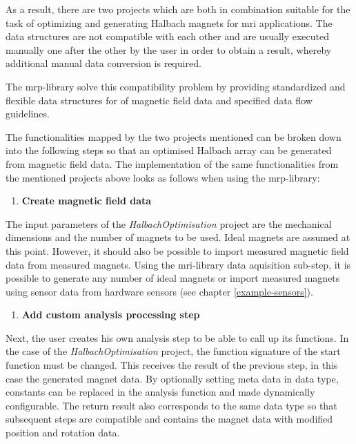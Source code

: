 As a result, there are two projects which are both in combination
suitable for the task of optimizing and generating Halbach magnets for
\gls{mri} applications. The data structures are not compatible with each
other and are usually executed manually one after the other by the user
in order to obtain a result, whereby additional manual data conversion
is required.

The \gls{mrp}-library solve this compatibility problem by providing
standardized and flexible data structures for of magnetic field data and
specified data flow guidelines.

The functionalities mapped by the two projects mentioned can be broken
down into the following steps so that an optimised Halbach array can be
generated from magnetic field data. The implementation of the same
functionalities from the mentioned projects above looks as follows when
using the \gls{mrp}-library:

\begin{enumerate}
\def\labelenumi{\arabic{enumi}.}
\tightlist
\item
  \textbf{Create magnetic field data}
\end{enumerate}

The input parameters of the \emph{HalbachOptimisation} 
project are the mechanical dimensions and the number of magnets to be
used. Ideal magnets are assumed at this point. However, it should also
be possible to import measured magnetic field data from measured
magnets. Using the \gls{mri}-library data aquisition sub-step, it is
possible to generate any number of ideal magnets or import measured
magnets using sensor data from hardware sensors (see chapter
\ref{example-sensors}).

\begin{enumerate}
\def\labelenumi{\arabic{enumi}.}
\setcounter{enumi}{1}
\tightlist
\item
  \textbf{Add custom analysis processing step}
\end{enumerate}

Next, the user creates his own analysis step to be able to call up its
functions. In the case of the \emph{HalbachOptimisation} 
project, the function signature of the start function must be changed.
This receives the result of the previous step, in this case the
generated magnet data. By optionally setting meta data in data type,
constants can be replaced in the analysis function and made dynamically
configurable. The return result also corresponds to the same data type
so that subsequent steps are compatible and contains the magnet data
with modified position and rotation data.

